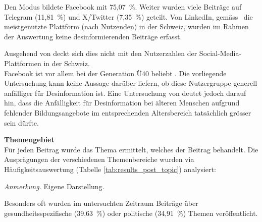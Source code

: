 \documentclass[12pt,a4paper]{article}        %
\begin{document}
\pagebreak
Den Modus bildete Facebook mit 75,07 \%. Weiter wurden viele Beiträge auf Telegram (11,81 \%) und X/Twitter (7,35 \%) geteilt. Von LinkedIn, gemäss~\cite{we_are_social_fuhrende_2025} die meistgenutzte Plattform (nach Nutzenden) in der Schweiz, wurden im Rahmen der Auswertung keine desinformierenden Beiträge erfasst.

Ausgehend von \cite{we_are_social_fuhrende_2025} deckt sich dies nicht mit den Nutzerzahlen der Social-Media-Plattformen in der Schweiz. \\
Facebook ist vor allem bei der Generation Ü40 beliebt \parencite[4]{igem__interessengemeinschaft_elektronische_medien_zusammenfassung_2024}. Die vorliegende Untersuchung kann keine Aussage darüber liefern, ob diese Nutzergruppe generell anfälliger für Desinformation ist. Eine Untersuchung von \textcite[15]{stegers_desinformation_2021} deutet jedoch darauf hin, dass die Anfälligkeit für Desinformation bei älteren Menschen aufgrund fehlender Bildungsangebote im entsprechenden Altersbereich tatsächlich grösser sein dürfte.

\textbf{Themengebiet}\\
Für jeden Beitrag wurde das Thema ermittelt, welches der Beitrag behandelt. Die Ausprägungen der verschiedenen Themenbereiche wurden via Häufigkeitsauswertung (Tabelle \ref{tab:results_post_topic}) analysiert:

\begin{table}[H]
  \caption{\textit{Relative Häufigkeitsverteilung der Themengebiete der Beiträge in \%}}
  \label{tab:results_post_topic}
  \centering
  \footnotesize\textit{Anmerkung.} Eigene Darstellung.
\end{table}
Besonders oft wurden im untersuchten Zeitraum Beiträge über gesundheitsspezifische (39,63 \%) oder politische (34,91 \%) Themen veröffentlicht.
\end{document}
